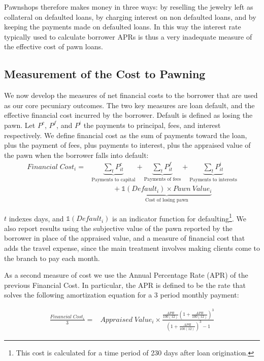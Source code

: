 \documentclass[oneside,11pt]{article}
\begin{document}
Pawnshops therefore makes money in three ways: by reselling the jewelry left as collateral on defaulted loans, by charging interest on non defaulted loans, and by keeping the payments made on defaulted loans. In this way the interest rate typically used to calculate borrower APRs is thus a very inadequate measure of the effective cost of pawn loans.

    
\subsection{Measurement of the Cost to Pawning} \label{costs}
    
We now develop the measures of net financial costs to the borrower that are used as our core pecuniary outcomes.  The two key measures are loan default, and the effective financial cost incurred by the borrower. Default is defined as losing the pawn. Let $P^c$, $P^f$, and $P^i$ the payments to principal, fees, and interest respectively. We define financial cost as the sum of payments toward the loan, plus the payment of fees, plus payments to interest, plus the appraised value of the pawn when the borrower falls into default: 
\begin{align*}
    Financial \; Cost_i =& \underbrace{\sum_t P^c_{it}}_{\text{Payments to capital}} + \underbrace{\sum_t P^f_{it}}_{\text{Payments of fees}}  +\underbrace{\sum_t P^i_{it}}_{\text{Payments to interests}} \\
    &\quad\qquad + \underbrace{\mathds{1}(Default_i) \times Pawn \: Value_i}_{\text{Cost of losing pawn}}
\end{align*}

\noindent $t$ indexes days, and $\mathds{1}(Default_i)$ is an indicator function for defaulting\footnote{This cost is calculated for a time period of 230 days after loan origination.}. We also report results using the subjective value of the pawn reported by the borrower in place of the appraised value, and a measure of financial cost that adds the travel expense, since the main treatment involves making clients come to the branch to pay each month.

As a second measure of cost we use the Annual Percentage Rate (APR) of the previous Financial Cost. In particular, the APR is defined to be the rate that solves the following amortization equation for a 3 period monthly payment:


\begin{align*}
    \frac{Financial\;Cost_i}{3} =& Appraised\; Value_i \times \frac{\frac{APR}{100(12)}\left(1+\frac{APR}{100(12)}\right)^3}{\left(1+\frac{APR}{100(12)}\right)^3-1}     
\end{align*}
\end{document}
